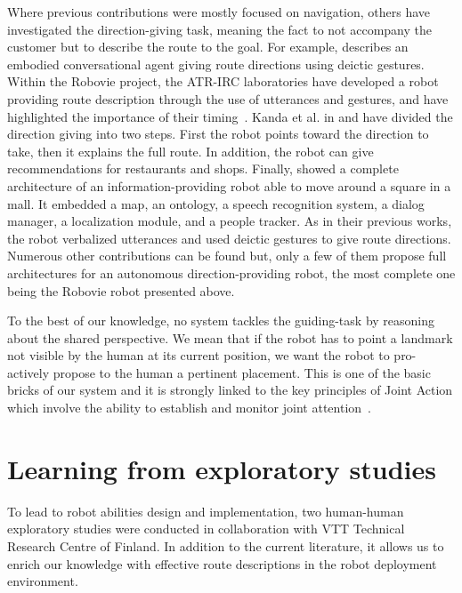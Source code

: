 Where previous contributions were mostly focused on navigation, others have investigated the direction-giving task, meaning the fact to not accompany the customer but to describe the route to the goal. For example, \cite{cassell_2007_trading} describes an embodied conversational agent giving route directions using deictic gestures. Within the Robovie project, the ATR-IRC laboratories have developed a robot providing route description through the use of utterances and gestures, and have highlighted the importance of their timing~\cite{okuno_2009_providing}. Kanda et al. in \cite{kanda_2009_affective} and \cite{kanda_2010_communication} have divided the direction giving into two steps. First the robot points toward the direction to take, then it explains the full route. In addition, the robot can give recommendations for restaurants and shops. Finally, \cite{satake_2015_should} showed a complete architecture of an information-providing robot able to move around a square in a mall. It embedded a map, an ontology, a speech recognition system, a dialog manager, a localization module, and a people tracker. As in their previous works, the robot verbalized utterances and used deictic gestures to give route directions. Numerous other contributions can be found but, only a few of them propose full architectures for an autonomous direction-providing robot, the most complete one being the Robovie robot presented above. 

To the best of our knowledge, no system tackles the guiding-task by reasoning about the shared perspective. We mean that if the robot has to point a landmark not visible by the human at its current position, we want the robot to pro-actively propose to the human a pertinent placement. This is one of the basic bricks of our system and it is strongly linked to the key principles of Joint Action which involve the ability to establish and monitor joint attention~\cite{pacherie_2012_phenomenology}.

\section{Learning from exploratory studies}

To lead to robot abilities design and implementation, two human-human exploratory studies were conducted in collaboration with VTT Technical Research Centre of Finland. In addition to the current literature, it allows us to enrich our knowledge with effective route descriptions in the robot deployment environment.

